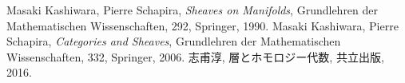 \begin{thebibliography}{20} 
     Masaki Kashiwara, Pierre Schapira, 
        \textit{Sheaves on Manifolds}, 
        Grundlehren der Mathematischen Wissenschaften, 292, Springer, 1990.
         Masaki Kashiwara, Pierre Schapira, 
        \textit{Categories and Sheaves}, 
        Grundlehren der Mathematischen Wissenschaften, 332, Springer, 2006.
         志甫淳, 層とホモロジー代数, 共立出版, 2016.
\end{thebibliography}




